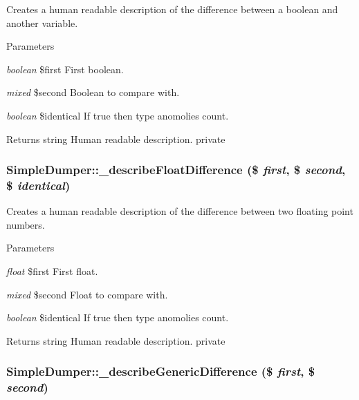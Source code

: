 \label{class_simple_dumper_a7985db05f6a6efc44fe11dda9af19e8b}
Creates a human readable description of the difference between a boolean and another variable. 
\begin{DoxyParams}{Parameters}
\item[{\em boolean}]\$first First boolean. \item[{\em mixed}]\$second Boolean to compare with. \item[{\em boolean}]\$identical If true then type anomolies count. \end{DoxyParams}
\begin{DoxyReturn}{Returns}
string Human readable description.  private 
\end{DoxyReturn}
\hypertarget{class_simple_dumper_a258987baad05d711b2cb6dd62f20ec90}{
\subsubsection[{\_\-describeFloatDifference}]{\setlength{\rightskip}{0pt plus 5cm}SimpleDumper::\_\-describeFloatDifference (\$ {\em first}, \/  \$ {\em second}, \/  \$ {\em identical})}}
\label{class_simple_dumper_a258987baad05d711b2cb6dd62f20ec90}
Creates a human readable description of the difference between two floating point numbers. 
\begin{DoxyParams}{Parameters}
\item[{\em float}]\$first First float. \item[{\em mixed}]\$second Float to compare with. \item[{\em boolean}]\$identical If true then type anomolies count. \end{DoxyParams}
\begin{DoxyReturn}{Returns}
string Human readable description.  private 
\end{DoxyReturn}
\hypertarget{class_simple_dumper_a34d972570eebff32d2bf3ac5486be532}{
\subsubsection[{\_\-describeGenericDifference}]{\setlength{\rightskip}{0pt plus 5cm}SimpleDumper::\_\-describeGenericDifference (\$ {\em first}, \/  \$ {\em second})}}
